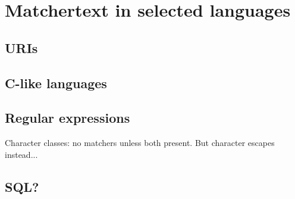 \section{Matchertext in selected languages}
\label{sec:langs}

\subsection{URIs}

\subsection{C-like languages}

\subsection{Regular expressions}

Character classes: no matchers unless both present.
But character escapes instead...

\subsection{SQL?}

